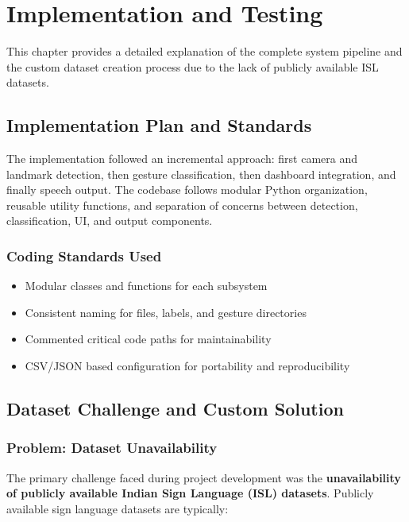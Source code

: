 \chapter{Implementation and Testing}

This chapter provides a detailed explanation of the complete system pipeline and the custom dataset creation process due to the lack of publicly available ISL datasets.

\section{Implementation Plan and Standards}

The implementation followed an incremental approach: first camera and landmark detection, then gesture classification, then dashboard integration, and finally speech output. The codebase follows modular Python organization, reusable utility functions, and separation of concerns between detection, classification, UI, and output components.

\subsection{Coding Standards Used}

\begin{itemize}
    \item Modular classes and functions for each subsystem
    \item Consistent naming for files, labels, and gesture directories
    \item Commented critical code paths for maintainability
    \item CSV/JSON based configuration for portability and reproducibility
\end{itemize}

\section{Dataset Challenge and Custom Solution}

\subsection{Problem: Dataset Unavailability}

The primary challenge faced during project development was the \textbf{unavailability of publicly available Indian Sign Language (ISL) datasets}. Publicly available sign language datasets are typically:

